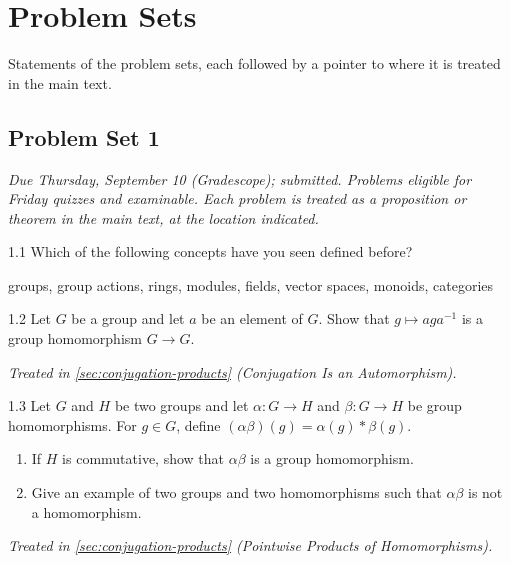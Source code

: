 \documentclass[11pt]{report}
\begin{document}
\chapter{Problem Sets}\label{ch:problem-sets}

Statements of the problem sets, each followed by a pointer to where it is treated in the main text.

\section*{Problem Set 1}
{}

\textit{Due Thursday, September 10 (Gradescope); submitted. Problems eligible for Friday quizzes and examinable. Each problem is treated as a proposition or theorem in the main text, at the location indicated.}

\begin{hwbox}{1.1}\label{hw:1.1}
Which of the following concepts have you seen defined before?
\begin{center} groups, group actions, rings, modules, fields, vector spaces, monoids, categories \end{center}
\end{hwbox}

\begin{hwbox}{1.2}\label{hw:1.2}
Let $G$ be a group and let $a$ be an element of $G$. Show that $g \mapsto a g a^{-1}$ is a group homomorphism $G \to G$.
\end{hwbox}
\textit{Treated in \ref{sec:conjugation-products} (Conjugation Is an Automorphism).}

\begin{hwbox}{1.3}\label{hw:1.3}
Let $G$ and $H$ be two groups and let $\alpha: G \to H$ and $\beta: G \to H$ be group homomorphisms. For $g \in G$, define $(\alpha\beta)(g) = \alpha(g) * \beta(g)$.
\begin{enumerate}
    \item If $H$ is commutative, show that $\alpha\beta$ is a group homomorphism.
    \item Give an example of two groups and two homomorphisms such that $\alpha\beta$ is not a homomorphism.
\end{enumerate}
\end{hwbox}
\textit{Treated in \ref{sec:conjugation-products} (Pointwise Products of Homomorphisms).}
\end{document}

